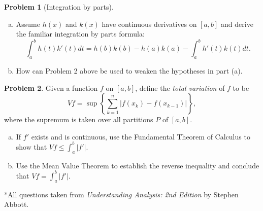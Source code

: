 \documentclass{amsart}
\newcommand{\+}[1]{\ensuremath{\mathbf{#1}}}
\theoremstyle{definition}
\newtheorem{prob}{Problem}
\begin{document}
\begin{prob}[Integration by parts]
 \begin{enumerate}[(a)]
  \item Assume $h(x)$ and $k(x)$ have continuous derivatives
  on $[a,b]$ and derive the familiar integration by parts formula:
  \[
  \int_a^b h(t) k'(t) dt = h(b) k(b) - h(a) k(a) - \int_a^b h'(t) k(t) dt.
  \]
  \item How can Problem 2 above be used to weaken the
  hypotheses in part (a).
 \end{enumerate}
\end{prob}

\vspace{3mm}


\begin{prob}
 Given a function $f$ on $[a,b]$, define the \emph{total variation}
 of $f$ to be
 \[
 Vf = \sup \left\{ \sum^n_{k=1} |f(x_k) - f(x_{k-1})|\right\},
 \]
 where the supremum is taken over all partitions $P$
 of $[a,b]$.
 \begin{enumerate}[(a)]
  \item If $f'$ exists and is continuous,
  use the Fundamental Theorem of Calculus to show that $Vf \leq \int_a^b|f'|$.
  \item Use the Mean Value Theorem to establish the
  reverse inequality and conclude that $Vf = \int_a^b|f'|$.
 \end{enumerate}
\end{prob}



\vspace{5mm}

*All questions taken from \emph{Understanding Analysis: 2nd Edition} by Stephen Abbott.
\end{document}
